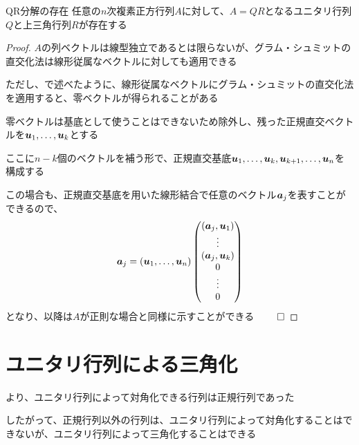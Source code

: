 \documentclass[../../../topic_linear-algebra]{subfiles}
\begin{document}
\begin{theorem*}{QR分解の存在}
  任意の$n$次複素正方行列$A$に対して、$A=QR$となるユニタリ行列$Q$と上三角行列$R$が存在する
\end{theorem*}

\begin{proof}
  $A$の列ベクトルは線型独立であるとは限らないが、グラム・シュミットの直交化法は線形従属なベクトルに対しても適用できる

  ただし、で述べたように、{線形従属なベクトルにグラム・シュミットの直交化法を適用}すると、零ベクトルが得られることがある

  \br

  零ベクトルは基底として使うことはできないため除外し、残った正規直交ベクトルを$\vb*{u}_1,\ldots,\vb*{u}_k$とする

  ここに$n-k$個のベクトルを補う形で、正規直交基底$\vb*{u}_1,\ldots,\vb*{u}_k,\vb*{u}_{k+1},\ldots,\vb*{u}_n$を構成する

  \br

  この場合も、正規直交基底を用いた線形結合で任意のベクトル$\vb*{a}_j$を表すことができるので、
  \begin{equation*}
    \vb*{a}_j = (\vb*{u}_1,\ldots,\vb*{u}_n) \begin{pmatrix}
      (\vb*{a}_j, \vb*{u}_1) \\
      \vdots                 \\
      (\vb*{a}_j, \vb*{u}_k) \\
      0                      \\
      \vdots                 \\
      0
    \end{pmatrix}
  \end{equation*}
  となり、以降は$A$が正則な場合と同様に示すことができる $\qed$
\end{proof}

\sectionline
\section{ユニタリ行列による三角化}

より、ユニタリ行列によって対角化できる行列は正規行列であった

したがって、正規行列以外の行列は、ユニタリ行列によって対角化することはできないが、ユニタリ行列によって三角化することはできる
\end{document}
